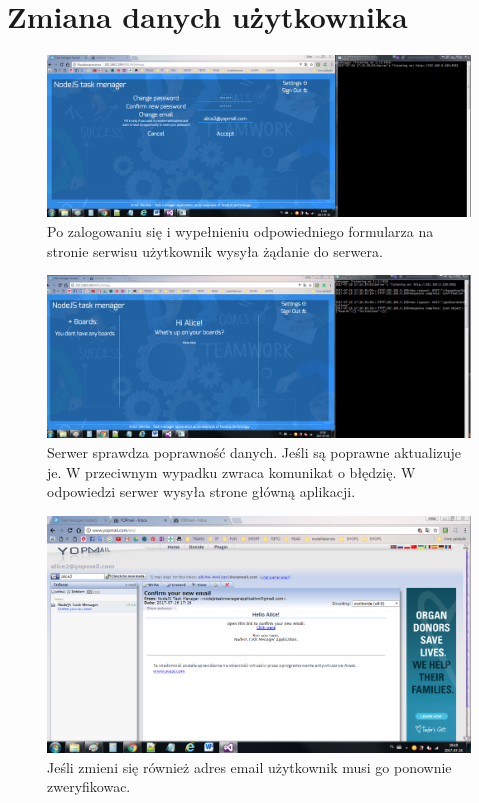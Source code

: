 \documentclass[12pt]{report}
\begin{document}
\section{Zmiana danych użytkownika}
\begin{figure}[!hb]
\centering
\includegraphics[width=\textwidth,height=\textheight,keepaspectratio]{61.png}
\captionsetup{labelformat=empty}
\caption[]{Po zalogowaniu się i wypełnieniu odpowiedniego formularza na stronie serwisu użytkownik wysyła żądanie do serwera.}
\end{figure}
\begin{figure}[!hb]
\centering
\includegraphics[width=\textwidth,height=\textheight,keepaspectratio]{62.png}
\captionsetup{labelformat=empty}
\caption[]{Serwer sprawdza poprawność danych. Jeśli są poprawne aktualizuje je.
W przeciwnym wypadku zwraca komunikat o błędzię. 
W odpowiedzi serwer wysyła strone główną aplikacji.}
\end{figure}
\begin{figure}[!hb]
\centering
\includegraphics[width=\textwidth,height=\textheight,keepaspectratio]{63.png}
\captionsetup{labelformat=empty}
\caption[]{Jeśli zmieni się również adres email użytkownik musi go ponownie zweryfikowac. }
\end{figure}
\end{document}

